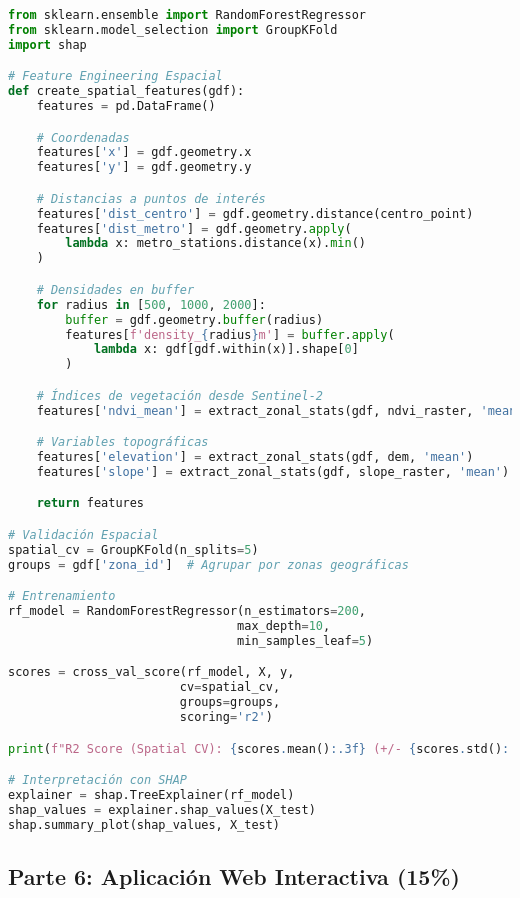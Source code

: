 \documentclass[12pt,a4paper]{article}
\begin{document}
\begin{lstlisting}[language=Python]
from sklearn.ensemble import RandomForestRegressor
from sklearn.model_selection import GroupKFold
import shap

# Feature Engineering Espacial
def create_spatial_features(gdf):
    features = pd.DataFrame()

    # Coordenadas
    features['x'] = gdf.geometry.x
    features['y'] = gdf.geometry.y

    # Distancias a puntos de interés
    features['dist_centro'] = gdf.geometry.distance(centro_point)
    features['dist_metro'] = gdf.geometry.apply(
        lambda x: metro_stations.distance(x).min()
    )

    # Densidades en buffer
    for radius in [500, 1000, 2000]:
        buffer = gdf.geometry.buffer(radius)
        features[f'density_{radius}m'] = buffer.apply(
            lambda x: gdf[gdf.within(x)].shape[0]
        )

    # Índices de vegetación desde Sentinel-2
    features['ndvi_mean'] = extract_zonal_stats(gdf, ndvi_raster, 'mean')

    # Variables topográficas
    features['elevation'] = extract_zonal_stats(gdf, dem, 'mean')
    features['slope'] = extract_zonal_stats(gdf, slope_raster, 'mean')

    return features

# Validación Espacial
spatial_cv = GroupKFold(n_splits=5)
groups = gdf['zona_id']  # Agrupar por zonas geográficas

# Entrenamiento
rf_model = RandomForestRegressor(n_estimators=200,
                                max_depth=10,
                                min_samples_leaf=5)

scores = cross_val_score(rf_model, X, y,
                        cv=spatial_cv,
                        groups=groups,
                        scoring='r2')

print(f"R2 Score (Spatial CV): {scores.mean():.3f} (+/- {scores.std():.3f})")

# Interpretación con SHAP
explainer = shap.TreeExplainer(rf_model)
shap_values = explainer.shap_values(X_test)
shap.summary_plot(shap_values, X_test)
\end{lstlisting}

\subsection{Parte 6: Aplicación Web Interactiva (15\%)}
\end{document}
